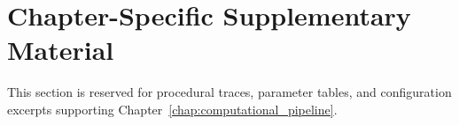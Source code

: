 
\section*{Chapter-Specific Supplementary Material}
\label{sec:supp_computational_pipeline}

This section is reserved for procedural traces, parameter tables, and
configuration excerpts supporting Chapter~\ref{chap:computational_pipeline}.
